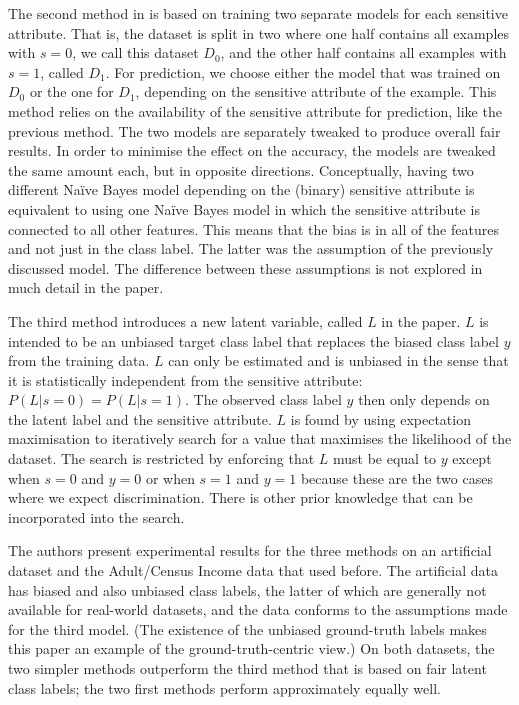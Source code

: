 The second method in \citet{calders2010three}
is based on training two separate models for each sensitive attribute.
That is, the dataset is split in two
where one half contains all examples with \(s=0\), we call this dataset \(D_0\),
and the other half contains all examples with \(s=1\), called \(D_1\).
For prediction, we choose either the model that was trained on \(D_0\) or the one for \(D_1\),
depending on the sensitive attribute of the example.
This method relies on the availability of the sensitive attribute for prediction,
like the previous method.
The two models are separately tweaked to produce overall fair results.
In order to minimise the effect on the accuracy, the models are tweaked the same amount each,
but in opposite directions.
Conceptually, having two different Na\"ive Bayes model depending on the (binary) sensitive attribute
is equivalent to using one Na\"ive Bayes model
in which the sensitive attribute is connected to all other features.
This means that the bias is in all of the features and not just in the class label.
The latter was the assumption of the previously discussed model.
The difference between these assumptions is not explored in much detail in the paper.

The third method introduces a new latent variable, called \(L\) in the paper.
\(L\) is intended to be an unbiased target class label
that replaces the biased class label \(y\) from the training data.
\(L\) can only be estimated and is unbiased
in the sense that it is statistically independent from the sensitive attribute: \(P(L|s=0) = P(L|s=1)\).
The observed class label \(y\) then only depends on the latent label and the sensitive attribute.
\(L\) is found by using expectation maximisation
to iteratively search for a value that maximises the likelihood of the dataset.
The search is restricted by enforcing that \(L\) must be equal to \(y\) except
when \(s=0\) and \(y=0\) or when \(s=1\) and \(y=1\)
because these are the two cases where we expect discrimination.
There is other prior knowledge that can be incorporated into the search.

The authors present experimental results for the three methods on an artificial dataset
and the Adult/Census Income data that \citet{calders2009building} used before.
The artificial data has biased and also unbiased class labels,
the latter of which are generally not available for real-world datasets,
and the data conforms to the assumptions made for the third model.
(The existence of the unbiased ground-truth labels makes this paper an example of the ground-truth-centric view.)
On both datasets, the two simpler methods outperform the third method
that is based on fair latent class labels;
the two first methods perform approximately equally well.

